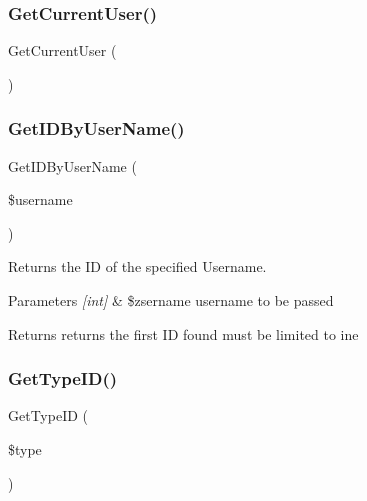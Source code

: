 \subsubsection{\texorpdfstring{Get\+Current\+User()}{GetCurrentUser()}}
{\footnotesize\ttfamily Get\+Current\+User (\begin{DoxyParamCaption}{ }\end{DoxyParamCaption})}

\mbox{\label{class_user_d_a_o_aac741335b1b0d391cb4c2471f58a1e68}} 
\subsubsection{\texorpdfstring{Get\+I\+D\+By\+User\+Name()}{GetIDByUserName()}}
{\footnotesize\ttfamily Get\+I\+D\+By\+User\+Name (\begin{DoxyParamCaption}\item[{}]{\$username }\end{DoxyParamCaption})}



Returns the ID of the specified Username. 


\begin{DoxyParams}{Parameters}
{\em \mbox{[}int\mbox{]}} & \$zsername username to be passed\\
\hline
\end{DoxyParams}
\begin{DoxyReturn}{Returns}
returns the first ID found must be limited to ine 
\end{DoxyReturn}
\mbox{\label{class_user_d_a_o_aca319b6c2beca52c72fd309d12adc9b4}} 
\subsubsection{\texorpdfstring{Get\+Type\+I\+D()}{GetTypeID()}}
{\footnotesize\ttfamily Get\+Type\+ID (\begin{DoxyParamCaption}\item[{}]{\$type }\end{DoxyParamCaption})}



